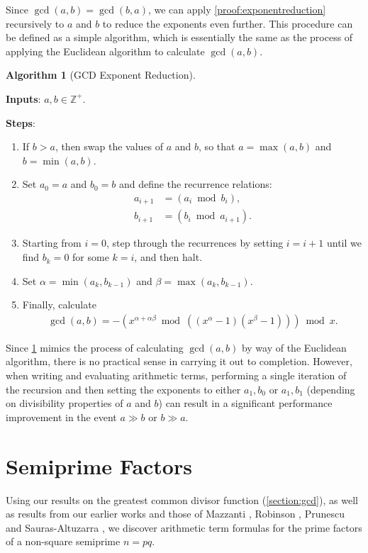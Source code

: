 \documentclass{article}
\theoremstyle{plain}
\theoremstyle{definition}
\newtheorem{algorithm}{Algorithm}
\newcommand{\Z}{\mathbb{Z}}
\begin{document}
Since $\gcd(a,b) = \gcd(b,a)$, we can apply \cref{proof:exponentreduction} recursively to $a$ and $b$ to reduce the exponents even further. This procedure can be defined as a simple algorithm, which is essentially the same as the process of applying the Euclidean algorithm to calculate $\gcd(a,b)$.

\begin{algorithm}[GCD Exponent Reduction] \label{algorithm:exponentreduction}

\textbf{Inputs}: $a,b \in \Z^+$.

\textbf{Steps}:
\begin{enumerate}
\item If $b>a$, then swap the values of $a$ and $b$, so that $a = \max(a,b)$ and $b=\min(a,b)$.
\item Set $a_0=a$ and $b_0=b$ and define the recurrence relations:
\begin{align*}
a_{i+1} &= (a_i \bmod b_i) , \\
b_{i+1} &= (b_i \bmod a_{i+1}) .
\end{align*}
\item Starting from $i=0$, step through the recurrences by setting $i = i + 1$ until we find $b_k = 0$ for some $k=i$, and then halt.
\item Set $\alpha = \min(a_k,b_{k-1})$ and $\beta = \max(a_k,b_{k-1})$.
\item Finally, calculate
\begin{align*}
\gcd(a,b) = - \left( x^{\alpha+\alpha \beta} \bmod ((x^{\alpha}-1)(x^{\beta}-1)) \right) \bmod x .
\end{align*}
\end{enumerate}
\end{algorithm}

Since \cref{algorithm:exponentreduction} mimics the process of calculating $\gcd(a,b)$ by way of the Euclidean algorithm, there is no practical sense in carrying it out to completion. However, when writing and evaluating arithmetic terms, performing a single iteration of the recursion and then setting the exponents to either $a_1,b_0$ or $a_1,b_1$ (depending on divisibility properties of $a$ and $b$) can result in a significant performance improvement in the event $a \gg b$ or $b \gg a$.

\section{Semiprime Factors} \label{section:semiprimes}
Using our results on the greatest common divisor function (\cref{section:gcd}), as well as results from our earlier works \cite{shunia2023simple,shunia2024polynomial} and those of Mazzanti \cite{mazzanti2002plainbases}, Robinson \cite{robinson1952arithmetic}, Prunescu and Sauras-Altuzarra \cite{prunescu2024factorial}, we discover arithmetic term formulas for the prime factors of a non-square semiprime $n=p q$.
\end{document}
